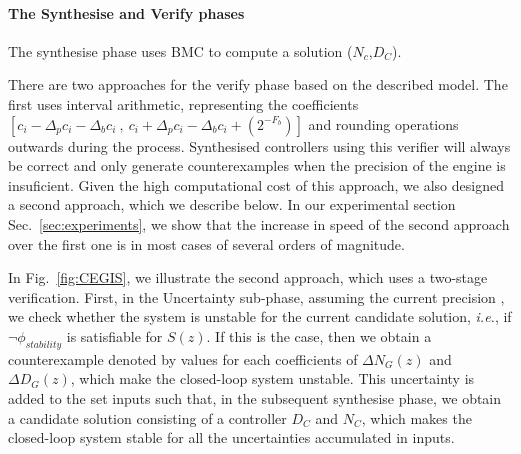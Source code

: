 \documentclass{sig-alternate-05-2015}
\newcommand{\red}[1]{{\color{red}#1}}
\begin{document}
\paragraph{The {\sc Synthesise} and {\sc Verify} phases}
The {\sc synthesise} phase uses BMC to 
compute a solution ($N_c$,$D_C$). %

There are two approaches for the {\sc verify} phase based on the
described model.  The first uses interval arithmetic, representing the
coefficients
$[{c}_i-\Delta_p{c}_i-\Delta_b{c}_i\ ,\
{c}_i+\Delta_p{c}_i-\Delta_b{c}_i+(2^{-F_b})]$
and rounding operations outwards during the process. 
Synthesised controllers using this verifier will always
be correct and only generate counterexamples when the precision of the
engine is insuficient.  Given the high computational cost of this
approach, we also designed a second approach, which we describe below.
In our experimental section Sec.~\ref{sec:experiments}, we 
show that the increase in speed of the second approach 
over the first one is in most cases of several orders of magnitude.

In Fig.~\ref{fig:CEGIS}, we illustrate the second approach, which 
uses a two-stage verification. 
First, in the {\sc Uncertainty} sub-phase, assuming the 
current precision ,
we check whether 
the system is unstable for the current candidate solution,
{\it i.e.}, if $\neg \phi_{stability}$ is satisfiable for $S(z)$.
If this is the case, then we obtain a counterexample denoted by 
values for each coefficients of $\Delta N_{G}(z)$ and $\Delta D_{G}(z)$, 
which make the closed-loop system unstable. 
This uncertainty is added to 
the set {\sc inputs} such that, in the subsequent {\sc synthesise} phase, 
we obtain a candidate solution consisting 
of a controller $D_C$ and $N_C$, which makes the closed-loop 
system stable for all the uncertainties accumulated in {\sc inputs}.
\end{document}
